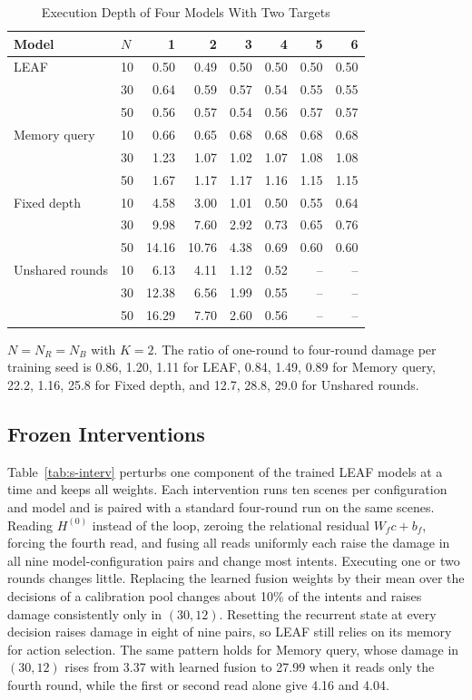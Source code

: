 \begin{table}[!t]
\centering
\scriptsize
\setlength{\tabcolsep}{3pt}
\caption{Execution Depth of Four Models With Two Targets}
\label{tab:s-depth-k2}
\begin{tabular}{@{}llrrrrrr@{}}
\toprule
Model & $N$ & 1 & 2 & 3 & 4 & 5 & 6\\
\midrule
LEAF & 10 & 0.50 & 0.49 & 0.50 & 0.50 & 0.50 & 0.50\\
 & 30 & 0.64 & 0.59 & 0.57 & 0.54 & 0.55 & 0.55\\
 & 50 & 0.56 & 0.57 & 0.54 & 0.56 & 0.57 & 0.57\\
Memory query & 10 & 0.66 & 0.65 & 0.68 & 0.68 & 0.68 & 0.68\\
 & 30 & 1.23 & 1.07 & 1.02 & 1.07 & 1.08 & 1.08\\
 & 50 & 1.67 & 1.17 & 1.17 & 1.16 & 1.15 & 1.15\\
Fixed depth & 10 & 4.58 & 3.00 & 1.01 & 0.50 & 0.55 & 0.64\\
 & 30 & 9.98 & 7.60 & 2.92 & 0.73 & 0.65 & 0.76\\
 & 50 & 14.16 & 10.76 & 4.38 & 0.69 & 0.60 & 0.60\\
Unshared rounds & 10 & 6.13 & 4.11 & 1.12 & 0.52 & -- & --\\
 & 30 & 12.38 & 6.56 & 1.99 & 0.55 & -- & --\\
 & 50 & 16.29 & 7.70 & 2.60 & 0.56 & -- & --\\
\bottomrule
\end{tabular}
\par\smallskip
\parbox{\columnwidth}{\scriptsize $N=N_R=N_B$ with $K=2$. The ratio of one-round to four-round damage per training seed is 0.86, 1.20, 1.11 for LEAF, 0.84, 1.49, 0.89 for Memory query, 22.2, 1.16, 25.8 for Fixed depth, and 12.7, 28.8, 29.0 for Unshared rounds.}
\end{table}

\subsection{Frozen Interventions}
Table~\ref{tab:s-interv} perturbs one component of the trained LEAF models at a time and keeps all weights. Each intervention runs ten scenes per configuration and model and is paired with a standard four-round run on the same scenes. Reading $H^{(0)}$ instead of the loop, zeroing the relational residual $W_fc+b_f$, forcing the fourth read, and fusing all reads uniformly each raise the damage in all nine model-configuration pairs and change most intents. Executing one or two rounds changes little. Replacing the learned fusion weights by their mean over the decisions of a calibration pool changes about 10\% of the intents and raises damage consistently only in $(30,12)$. Resetting the recurrent state at every decision raises damage in eight of nine pairs, so LEAF still relies on its memory for action selection. The same pattern holds for Memory query, whose damage in $(30,12)$ rises from 3.37 with learned fusion to 27.99 when it reads only the fourth round, while the first or second read alone give 4.16 and 4.04.


